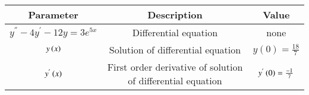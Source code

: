 \begin{tabular}[12pt]{ |c| c|c|}
    \hline
    \textbf{Parameter} & \textbf{Description} & \textbf{Value}\\ 
    \hline
    $y^{''} - 4y^{'} -12y = 3e^{5x}$ & Differential equation & none\\
    \hline
    $y\left(x\right)$ &Solution of  differential equation & $y(0)=\frac{18}{7}$\\
    \hline
    $y^{'}\left(x\right)$ & First order derivative of solution of differential equation & $y^{'}\left(0\right)=\frac{-1}{7}$\\
    \hline
     \end{tabular}
